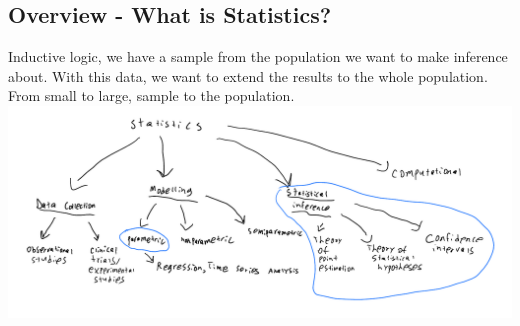 \documentclass[12 pt]{article}
\begin{document}
        \subsection{Overview - What is Statistics?}
        Inductive logic, we have a sample from the population we want
        to make inference about. With this data, we want to extend the
        results to the whole population. From small to large, sample
        to the population.
        \\ \includegraphics[width=\textwidth]{i1.pdf}
\end{document}
